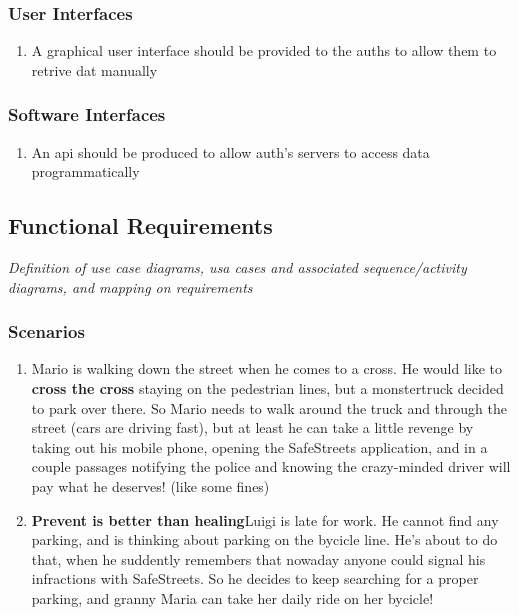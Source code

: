 \documentclass{article}
\newcommand{\enum}[1]{\texttt{#1.\arabic*}}
\begin{document}
		\subsubsection{User Interfaces}
			\begin{enumerate}
				\item A graphical user interface should be provided to the auths to allow them to retrive dat manually
			\end{enumerate}
			
		\subsubsection{Software Interfaces}
			\begin{enumerate}
					\item An api should be produced to allow auth's servers to access data programmatically
			\end{enumerate}
			
	\subsection{Functional Requirements} \textit{Definition of use case diagrams, usa cases and associated sequence/activity diagrams, and mapping on requirements}
	
		\subsubsection{Scenarios}
		
			\begin{enumerate}[label=\enum{S}]
				\item \label{S_The man, the street and the monstertruck}
				Mario is walking down the street when he comes to a cross. He would like to \textbf{cross the cross} staying on the pedestrian lines, but a monstertruck decided to park over there. So Mario needs to walk around the truck and through the street (cars are driving fast), but at least he can take a little revenge by taking out his mobile phone, opening the SafeStreets application, and in a couple passages notifying the police and knowing the crazy-minded driver will pay what he deserves! (like some fines)
			\item \textbf{Prevent is better than healing}Luigi is late for work. He cannot find any parking, and is thinking about parking on the bycicle line. He's about to do that, when he suddently remembers that nowaday anyone could signal his infractions with SafeStreets. So he decides to keep searching for a proper parking, and granny Maria can take her daily ride on her bycicle!
			\end{enumerate}
			
\end{document}
